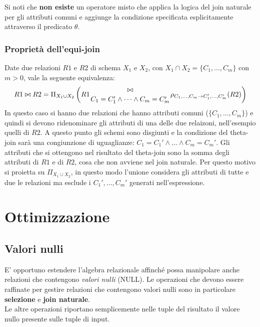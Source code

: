 \documentclass{report}
\begin{document}
Si noti che \textbf{non esiste} un operatore misto che applica la logica del join naturale per gli attributi comuni e aggiunge la condizione specificata esplicitamente attraverso il predicato $\theta$.

\subsubsection{Propriet\`a dell'equi-join}

Date due relazioni $R1$ e $R2$ di schema $X_1$ e $X_2$, con $X_1 \cap X_2 = \{ C_1, \dots, C_m\}$ con $m > 0$, vale la seguente equivalenza:
\[ R1 \bowtie R2 = \Pi_{X_1 \cup X_2} \left(R1 {\bowtie \atop C_1=C_1' \wedge \dots \wedge C_m=C_m'} \rho_{C_1,\dots,C_m \to C_1', \dots, C_m'}(R2)\right) \]
In questo caso si hanno due relazioni che hanno attributi comuni ($\{ C_1, \dots, C_m\}$) e quindi si devono ridenominare gli attributi di una delle due relaizoni, nell'esempio quelli di $R2$. A questo punto gli schemi sono disgiunti e la condizione del theta-join sar\`a una congiunzione di uguaglianze: $C_1=C_1' \wedge \dots \wedge C_m=C_m'$. Gli attributi che si ottengono nel risultato del theta-join sono la somma degli attributi di $R1$ e di $R2$, cosa che non avviene nel join naturale. Per questo motivo si proietta su $\Pi_{X_1\cup X_2}$, in questo modo l'unione considera gli attributi di tutte e due le relazioni ma esclude i $C_1', \dots, C_m'$ generati nell'espressione.

\section{Ottimizzazione}
\subsection{Valori nulli}
E’ opportuno estendere l’algebra relazionale affinché possa manipolare anche relazioni che contengono \emph{valori nulli} (NULL). Le operazioni che devono essere raffinate per gestire relazioni che contengono valori nulli sono in particolare \textbf{selezione} e \textbf{join naturale}.\\
Le altre operazioni riportano semplicemente nelle tuple del risultato il valore nullo presente sulle tuple di input.
\end{document}
